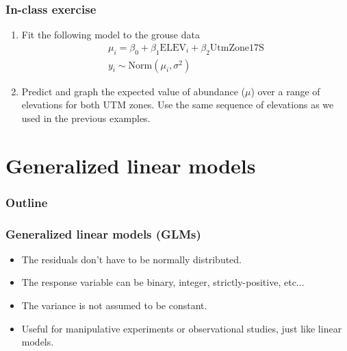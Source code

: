 \documentclass[color=usenames,dvipsnames]{beamer}\usepackage[]{graphicx}\usepackage[]{xcolor}
\begin{document}
\begin{frame}
  \frametitle{In-class exercise}
  \begin{enumerate}
    \item Fit the following model to the grouse data
      \begin{gather*}
        \mu_i = \beta_0 + \beta_1\mathrm{ELEV}_i + \beta_2\mathrm{UtmZone17S}\\
        y_i \sim \mathrm{Norm}(\mu_i,\sigma^2)
      \end{gather*}
    \item Predict and graph the expected value of abundance ($\mu$)
      over a range of elevations for both UTM zones. Use the same
      sequence of elevations as we used in the previous examples.
  \end{enumerate}
\end{frame}






\section{Generalized linear models}



\begin{frame}[plain]
  \frametitle{Outline}
  \Large
  \tableofcontents[currentsection]
\end{frame}




\begin{frame}
  \frametitle{Generalized linear models (GLMs)}
  \large
  \begin{itemize}%
    \item<2-> The residuals don't have to be normally distributed.
    \item<3-> The response variable can be binary, integer,
      strictly-positive, etc...
    \item<4-> The variance is not assumed to be constant.
    \item<5-> Useful for manipulative experiments or observational
      studies, just like linear models.
  \end{itemize}
  \vfill
\end{frame}
\end{document}
